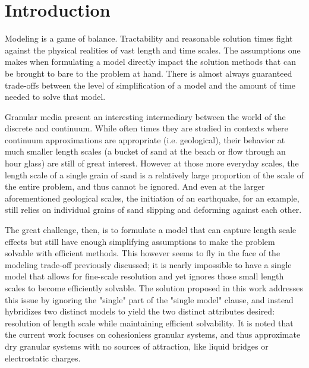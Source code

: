 \chapter{Introduction}

Modeling is a game of balance. Tractability and reasonable solution times fight against the physical realities of vast length and time scales. The assumptions one makes when formulating a model directly impact the solution methods that can be brought to bare to the problem at hand. There is almost always guaranteed trade-offs between the level of simplification of a model and the amount of time needed to solve that model.

Granular media present an interesting intermediary between the world of the discrete and continuum. While often times they are studied in contexts where continuum approximations are appropriate (i.e. geological), their behavior at much smaller length scales (a bucket of sand at the beach or flow through an hour glass) are still of great interest. However at those more everyday scales, the length scale of a single grain of sand is a relatively large proportion of the scale of the entire problem, and thus cannot be ignored. And even at the larger aforementioned geological scales, the initiation of an earthquake, for an example, still relies on individual grains of sand slipping and deforming against each other.

The great challenge, then, is to formulate a model that can capture length scale effects but still have enough simplifying assumptions to make the problem solvable with efficient methods. This however seems to fly in the face of the modeling trade-off previously discussed; it is nearly impossible to have a single model that allows for fine-scale resolution and yet ignores those small length scales to become efficiently solvable. The solution proposed in this work addresses this issue by ignoring the "single" part of the "single model" clause, and instead hybridizes two distinct models to yield the two distinct attributes desired: resolution of length scale while maintaining efficient solvability. It is noted that the current work focuses on cohesionless granular systems, and thus approximate dry granular systems with no sources of attraction, like liquid bridges or electrostatic charges.

